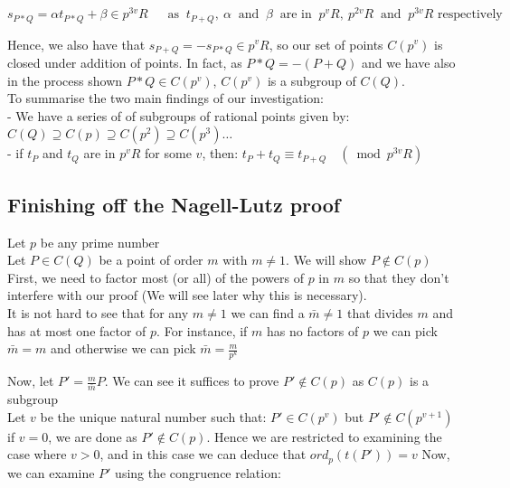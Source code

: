 \documentclass{article}
\begin{document}
\[s_{P*Q} = \alpha t_{P*Q} + \beta \in p^{3v}R \quad \ \text{ as } \ t_{P+Q}, \ \alpha \ \text{ and } \ \beta \ \text{ are in } \ p^v R, \ p^{2v} R \ \text{ and } \ p^{3v} R  \text{ respectively} \]

Hence, we also have that $s_{P+Q} = -s_{P*Q} \in p^v R$, so our set of points $C(p^v)$ is closed under addition of points. In fact, as $P*Q = - (P+Q)$ and we have also in the process shown $P*Q \in C(p^v)$, $C(p^v)$ is a subgroup of $C(Q)$. \\

To summarise the two main findings of our investigation:\\

- We have a series of of subgroups of rational points given by: $C(Q) \supseteq C(p) \supseteq C(p^2) \supseteq C(p^3) \dots$\\

- if $t_P$ and $t_Q$ are in $p^v R$ for some $v$, then: $t_P + t_Q  \equiv t_{P+Q} \quad (\bmod{p^{3v}R})$

\subsection{Finishing off the Nagell-Lutz proof}

Let $p$ be any prime number\\

Let $P \in C(Q)$ be a point of order $m$ with $m \neq 1$. We will show $P \notin C(p)$ \\

First, we need to factor most (or all) of the powers of $p$ in $m$ so that they don't interfere with our proof (We will see later why this is necessary).\\

It is not hard to see that for any $m \neq 1$ we can find a $\bar{m} \neq 1$ that divides $m$ and has at most one factor of $p$. For instance, if $m$ has no factors of $p$ we can pick $\bar{m} = m$ and otherwise we can pick $\bar{m} = \frac{m}{p^k}$

Now, let $P' = \frac{m}{\bar{m}} P$. We can see it suffices to prove $P' \notin C(p)$ as $C(p)$ is a subgroup\\

Let $v$ be the unique natural number such that: $P' \in C(p^v)$ but $P' \notin C(p^{v+1})$ \\

if $v = 0$, we are done as $P' \notin C(p)$. Hence we are restricted to examining the case where $v > 0$, and in this case we can deduce that $ord_p(t(P')) = v$ Now, we can examine $P'$ using the congruence relation:
\end{document}
